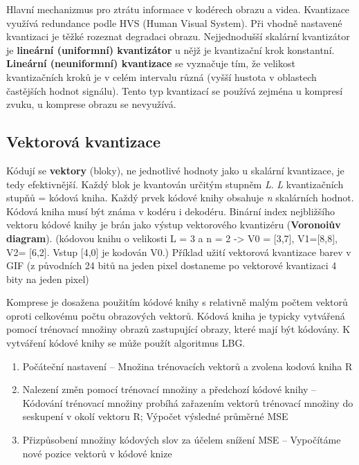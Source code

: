 Hlavní mechanizmus pro ztrátu informace v kodérech obrazu a videa. Kvantizace využívá redundance podle HVS (Human Visual System). Při vhodně nastavené kvantizaci je těžké rozeznat degradaci obrazu. Nejjednodušší skalární kvantizátor je \textbf{lineární (uniformní) kvantizátor} u nějž je kvantizační krok konstantní. \textbf{Lineární (neuniformní) kvantizace} se vyznačuje tím, že velikost kvantizačních kroků je v celém intervalu různá (vyšší hustota v oblastech častějších hodnot signálu). Tento typ kvantizací se používá zejména u kompresí zvuku, u komprese obrazu se nevyužívá.


\subsection{Vektorová kvantizace}

Kódují se \textbf{vektory} (bloky), ne jednotlivé hodnoty jako u skalární kvantizace, je tedy efektivnější. Každý blok je kvantován určitým stupněm \textit{L}. \textit{L} kvantizačních stupňů = kódová kniha. Každý prvek kódové knihy obsahuje \textit{n} skalárních hodnot. Kódová kniha musí být známa v kodéru i dekodéru. Binární index nejbližšího vektoru kódové knihy je brán
jako výstup vektorového kvantizéru (\textbf{Voronoiův diagram}). (kódovou knihu o velikosti L = 3 a n = 2 -> V0 = [3,7], V1=[8,8], V2= [6,2]. Vstup [4,0] je kodován V0.) Příklad užití vektorová kvantizace barev v GIF (z původních 24 bitů na jeden pixel dostaneme po vektorové kvantizaci 4 bity na jeden pixel)

Komprese je dosažena použitím kódové knihy s relativně malým počtem vektorů oproti celkovému počtu obrazových vektorů. Kódová kniha je typicky vytvářená pomocí trénovací množiny obrazů zastupující obrazy, které mají být kódovány. K vytváření kódové knihy se může použít algoritmus LBG.

\begin{enumerate}
    \item Počáteční nastavení -- Množina trénovacích vektorů a zvolena kodová kniha R
    \item Nalezení změn pomocí trénovací množiny a předchozí kódové knihy -- Kódování trénovací množiny probíhá zařazením vektorů trénovací množiny do seskupení v okolí vektoru R; Výpočet výsledné průměrné MSE 
    \item Přizpůsobení množiny kódových slov za účelem snížení MSE -- Vypočítáme nové pozice vektorů v kódové knize

\end{enumerate}

